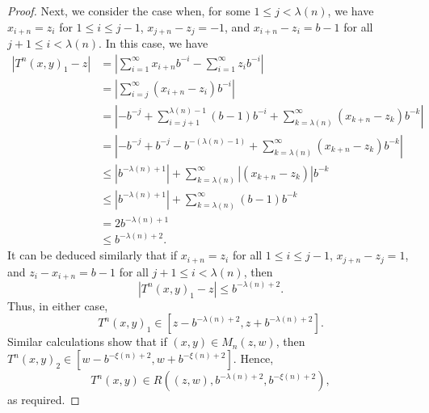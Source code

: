 \documentclass[10pt,a4paper]{amsart}
\begin{document}
\begin{proof}
Next, we consider the case when, for some $1 \leq j < \lambda(n)$, we have $x_{i+n}=z_{i}$ for $1\leq i\leq j-1$, $x_{j+n}-z_{j}=-1$, and $x_{i+n}-z_{i}=b-1$ for all $j+1 \leq i < \lambda(n)$. In this case, we have 
 \begin{align*}
 \left|T^{n}(x,y)_{1}-z\right| &{= \left|\sum_{i=1}^{\infty}{x_{i+n}b^{-i}} - \sum_{i=1}^{\infty}{z_ib^{-i}}\right|} \\
 &{= \left| \sum_{i=j}^{\infty}{(x_{i+n}-z_i)b^{-i}} \right|} \\
 &= \left|-b^{-j}+\sum_{i=j+1}^{\lambda(n)-1}(b-1)b^{-i} +\sum_{k=\lambda(n)}^{\infty}(x_{k+n}-z_{k})b^{-k}\right| \\
 &=\left|-b^{-j} +b^{-j}-b^{-(\lambda(n)-1)} + \sum_{k=\lambda(n)}^{\infty}(x_{k+n}-z_{k})b^{-k}\right| \\
 & \leq \left|b^{-\lambda(n)+1}\right| + \sum_{k=\lambda(n)}^{\infty}|(x_{k+n}-z_k)|b^{-k} \\
 & \leq \left|b^{-\lambda(n)+1}\right| + \sum_{k=\lambda(n)}^{\infty}(b-1)b^{-k} \\
 & = 2 b^{-\lambda(n)+1} \\
 &\leq b^{-\lambda(n)+2}.
 \end{align*}
 It can be deduced similarly that if $x_{i+n}=z_i$ for all $1 \leq i \leq j-1$, $x_{j+n}-z_{j}=1$, and \mbox{$z_{i}-x_{i+n}=b-1$} for all $j+1 \leq i < \lambda(n)$, then
 \[|T^{n}(x,y)_{1}-z|\leq b^{-\lambda(n)+2}.\]
 Thus, in either case, 
 \[T^{n}(x,y)_{1} \in [z-b^{-\lambda(n)+2}, z+b^{-\lambda(n)+2}].\]  
 Similar calculations show that if $(x,y) \in M_n(z,w)$, then $T^{n}(x,y)_{2} \in [w-b^{-\xi(n)+2},w+b^{-\xi(n)+2}]$. Hence,
 \begin{equation*}
  T^{n}(x,y) \in R\left( (z,w), b^{-\lambda(n)+2}, b^{-\xi(n)+2} \right),
  \end{equation*}
  as required.
  \end{proof}
\end{document}
